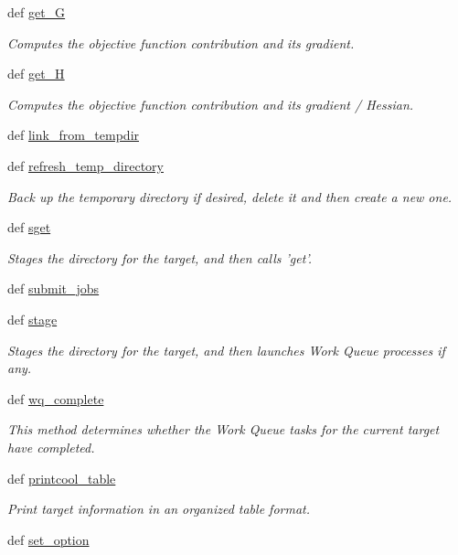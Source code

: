 \begin{DoxyCompactItemize}
def \hyperlink{classforcebalance_1_1target_1_1Target_afa8cc38c8bba8861c072e789717aa049}{get\-\_\-\-G}
\begin{DoxyCompactList}\small\item\em Computes the objective function contribution and its gradient. \end{DoxyCompactList}\item 
def \hyperlink{classforcebalance_1_1target_1_1Target_a1d2ee27fe86a09769c1816af23b09adb}{get\-\_\-\-H}
\begin{DoxyCompactList}\small\item\em Computes the objective function contribution and its gradient / Hessian. \end{DoxyCompactList}\item 
def \hyperlink{classforcebalance_1_1target_1_1Target_a5aa4958cea0a48138511567a076c5a82}{link\-\_\-from\-\_\-tempdir}
\item 
def \hyperlink{classforcebalance_1_1target_1_1Target_afe815eafab06ac92f10bbf4b88ad95c8}{refresh\-\_\-temp\-\_\-directory}
\begin{DoxyCompactList}\small\item\em Back up the temporary directory if desired, delete it and then create a new one. \end{DoxyCompactList}\item 
def \hyperlink{classforcebalance_1_1target_1_1Target_a51d58b55242bf4d4909c1837174f5f3c}{sget}
\begin{DoxyCompactList}\small\item\em Stages the directory for the target, and then calls 'get'. \end{DoxyCompactList}\item 
def \hyperlink{classforcebalance_1_1target_1_1Target_a78cd29b94cbcc201eed99c78aaef46a4}{submit\-\_\-jobs}
\item 
def \hyperlink{classforcebalance_1_1target_1_1Target_af8d2a4658c87841e40296795aec478bb}{stage}
\begin{DoxyCompactList}\small\item\em Stages the directory for the target, and then launches Work Queue processes if any. \end{DoxyCompactList}\item 
def \hyperlink{classforcebalance_1_1target_1_1Target_af6099ec09486213869dba2491bd8ea04}{wq\-\_\-complete}
\begin{DoxyCompactList}\small\item\em This method determines whether the Work Queue tasks for the current target have completed. \end{DoxyCompactList}\item 
def \hyperlink{classforcebalance_1_1target_1_1Target_ac30a4e9d7d9fe06f7caefa5f7cfab09b}{printcool\-\_\-table}
\begin{DoxyCompactList}\small\item\em Print target information in an organized table format. \end{DoxyCompactList}\item 
def \hyperlink{classforcebalance_1_1BaseClass_a73e9a37a7632e79eb99f49bd15aced45}{set\-\_\-option}
\end{DoxyCompactItemize}
